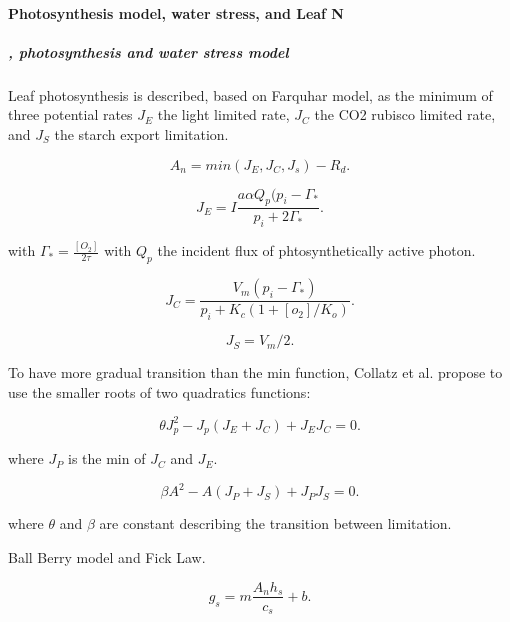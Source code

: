 \documentclass[a4paper,11pt]{article}
\begin{document}
\paragraph{Photosynthesis model, water stress, and Leaf N}

\subparagraph{\citet{Collatz-1991}, photosynthesis and water stress model}

  
Leaf photosynthesis is described, based on Farquhar model, as the minimum of three potential rates $J_E$ the light limited rate, $J_C$ the CO2 rubisco limited rate, and $J_S$ the starch export limitation.

\begin{equation}
\label{eq:An}
A_n= min(J_E, J_C, J_s) - R_d.
\end{equation}

  
\begin{equation}
\label{eq:JC}
J_E= I \frac{a \alpha Q_p (p_i - \Gamma_*}{p_i + 2 \Gamma_*}.
\end{equation}

with $\Gamma_* = \frac{[O_2]}{2\tau}$
with $Q_p$ the incident flux of phtosynthetically active photon.

\begin{equation}
\label{eq:JE}
J_C= \frac{V_m (p_i - \Gamma_*)}{p_i + K_c (1+[o_2]/K_o)}.
\end{equation}

\begin{equation}
\label{eq:JS}
J_S= V_m/2.
\end{equation}

To have more gradual transition than the min function, Collatz et al. propose to use the smaller roots of two quadratics functions:

\begin{equation}
\label{eq:Q1}
\theta J_p^2 - J_p(J_E+J_C) + J_E J_C= 0.
\end{equation}

where $J_P$ is the min of $J_C$ and $J_E$.

\begin{equation}
\label{eq:Q2}
\beta A^2 - A(J_P+J_S) + J_P J_S= 0.
\end{equation}

where $\theta$ and $\beta$ are constant describing the transition between limitation.

Ball Berry model and Fick Law.

\begin{equation}
\label{eq:gs}
g_s= m \frac{A_n h_s}{c_s}+b.
\end{equation}
\end{document}

